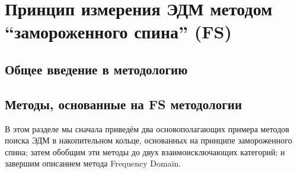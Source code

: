 \chapter{Принцип измерения ЭДМ методом ``замороженного спина'' (FS)}

\section{Общее введение в методологию}


\section{Методы, основанные на FS методологии}
В этом разделе мы сначала приведём два основополагающих примера методов поиска ЭДМ
в накопительном кольце, основанных на принципе замороженного спина;
затем обобщим  эти методы до двух взаимоисключающих категорий;
и завершим описанием метода Frequency Domain.


